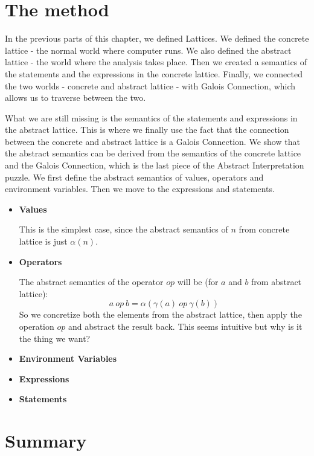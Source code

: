 

\section{The method} %

In the previous parts of this chapter, we defined Lattices.
We defined the concrete lattice - the normal world where computer runs.
We also defined the abstract lattice - the world where the analysis takes place.
Then we created a semantics of the statements and the expressions in the concrete lattice.
Finally, we connected the two worlds - concrete and abstract lattice - with Galois Connection, which allows us to
traverse between the two.

What we are still missing is the semantics of the statements and expressions in the abstract lattice.
This is where we finally use the fact that the connection between the concrete and abstract lattice is a Galois
Connection.
We show that the abstract semantics can be derived from the semantics of the concrete lattice and the Galois Connection,
which is the last piece of the Abstract Interpretation puzzle.
We first define the abstract semantics of values, operators and environment variables.
Then we move to the expressions and statements.

\begin{itemize}
    \item \textbf{Values}

    This is the simplest case, since the abstract semantics of $n$ from concrete lattice is just $\alpha(n)$.

    \item \textbf{Operators}

    The abstract semantics of the operator $op$ will be (for $a$ and $b$ from abstract lattice):
    \[a \: op \: b = \alpha(\gamma(a) \: op \: \gamma(b))\]
    So we concretize both the elements from the abstract lattice, then apply the operation $op$ and abstract the result
    back.
    This seems intuitive but why is it the thing we want?


    \item \textbf{Environment Variables}
    \item \textbf{Expressions}
    \item \textbf{Statements}
\end{itemize}

\section*{Summary}
